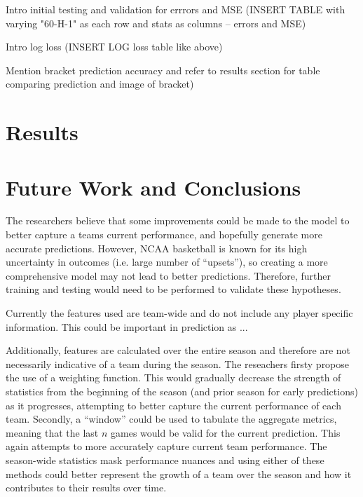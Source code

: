 \documentclass[conference]{IEEEtran}
\begin{document}
Intro initial testing and validation for errrors and MSE
(INSERT TABLE with varying "60-H-1" as each row and stats as columns -- errors and MSE)

Intro log loss 
(INSERT LOG loss table like above)

Mention bracket prediction accuracy and refer to results section for table comparing prediction and image of bracket)
\section{Results}

\section{Future Work and Conclusions}
%

The researchers believe that some improvements could be made to the model to better capture a teams current performance, and hopefully generate more accurate predictions. However, NCAA basketball is known for its high uncertainty in outcomes (i.e. large number of ``upsets''), so creating a more comprehensive model may not lead to better predictions. Therefore, further training and testing would need to be performed to validate these hypotheses.

Currently the features used are team-wide and do not include any player specific information. This could be important in prediction as ...

Additionally, features are calculated over the entire season and therefore are not necessarily indicative of a team during the season. The reseachers firsty propose the use of a weighting function. This would gradually decrease the strength of statistics from the beginning of the season (and prior season for early predictions) as it progresses, attempting to better capture the current performance of each team. Secondly, a ``window'' could be used to tabulate the aggregate metrics, meaning that the last $n$ games would be valid for the current prediction. This again attempts to more accurately capture current team performance. The season-wide statistics mask performance nuances and using either of these methods could better represent the growth of a team over the season and how it contributes to their results over time.
\end{document}
